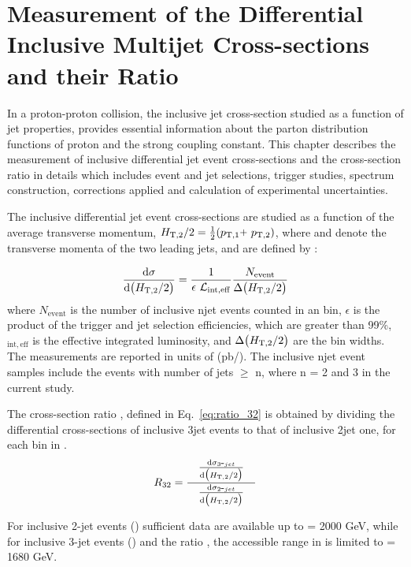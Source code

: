 \chapter{Measurement of the Differential Inclusive Multijet Cross-sections and their Ratio}
\label{chap:Measurement}
In a proton-proton collision, the inclusive jet cross-section studied as a function of jet properties, provides essential information about the parton distribution functions of proton and the strong coupling constant. This chapter describes the measurement of inclusive differential jet event cross-sections and the cross-section ratio in details which includes event and jet selections, trigger studies, spectrum construction, corrections applied and calculation of experimental uncertainties.

The inclusive differential jet event cross-sections are studied as a function of the average transverse momentum, $\httwo = \frac{1}{2}(\ptone\plus \pttwo)$, where \ptone and \pttwo denote the transverse momenta of the two leading jets, and are defined by :

\begin{equation}
 \label{eq:inclusive_formula}
 {\dd{\sigma}{\big(\httwo\big)}} = \frac{1}{\epsilon~\lumi_{\mathrm{int,eff}}}\frac{N_\mathrm{event}}{\Delta\big(\httwo\big)}
\end{equation}
where $N_\mathrm{event}$ is the number of inclusive n\hy jet events counted in an \httwo bin, $\epsilon$ is the product of the trigger and jet selection efficiencies, which are greater than 99\%, \lumins$_{\mathrm{int,eff}}$ is the effective integrated luminosity, and $ \Delta\big(H_{\mathrm{T,2}}/2\big)$ are the bin widths. The measurements are reported in units of (pb/\GeV). The inclusive n\hy jet event samples include the events with number of jets $\geq$ n, where n = 2 and 3 in the current study. 

The cross-section ratio \rations, defined in Eq.~\ref{eq:ratio_32} is obtained by dividing the differential cross-sections of inclusive 3\hy jet events to that of inclusive 2\hy jet one, for each bin in \httwo.
\begin{equation}
 \label{eq:ratio_32}
 \ratio = \frac[10pt]{{\dd{\sigma_{3\hy jet}}{\big(\httwo\big)}}}{\dd{\sigma_{2\hy jet}}{\big(\httwo\big)}}
\end{equation}

For inclusive 2-jet events (\njt) sufficient data are available up to \httwo = 2000 GeV, while for inclusive 3-jet events (\njth) and the ratio \rations, the accessible range in \httwo is limited to \httwo = 1680 GeV.

